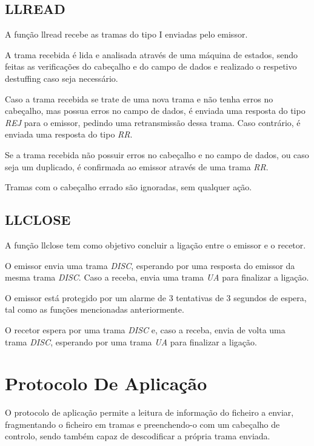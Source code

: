 \documentclass[11pt]{article}
\begin{document}
\subsection{LLREAD}

A função llread recebe as tramas do tipo I enviadas pelo emissor.

A trama recebida é lida e analisada através de uma máquina de estados, sendo feitas as verificações do cabeçalho e do campo de dados e realizado o respetivo destuffing caso seja necessário.

Caso a trama recebida se trate de uma nova trama e não tenha erros no cabeçalho, mas possua erros no campo de dados, é enviada uma resposta do tipo \textit{REJ} para o emissor, pedindo uma retransmissão dessa trama. Caso contrário, é enviada uma resposta do tipo \textit{RR}.

Se a trama recebida não possuir erros no cabeçalho e no campo de dados, ou caso seja um duplicado, é confirmada ao emissor através de uma trama \textit{RR}.

Tramas com o cabeçalho errado são ignoradas, sem qualquer ação.

\subsection{LLCLOSE}

A função llclose tem como objetivo concluir a ligação entre o emissor e o recetor.

O emissor envia uma trama \textit{DISC}, esperando por uma resposta do emissor da mesma trama \textit{DISC}. Caso a receba, envia uma trama \textit{UA} para finalizar a ligação.

O emissor está protegido por um alarme de 3 tentativas de 3 segundos de espera, tal como as funções mencionadas anteriormente.

O recetor espera por uma trama \textit{DISC} e, caso a receba, envia de volta uma trama \textit{DISC}, esperando por uma trama \textit{UA} para finalizar a ligação.


\section{Protocolo De Aplicação}

O protocolo de aplicação permite a leitura de informação do ficheiro a enviar, fragmentando o ficheiro em tramas e preenchendo-o com um cabeçalho de controlo, sendo também capaz de descodificar a própria trama enviada.
\end{document}
